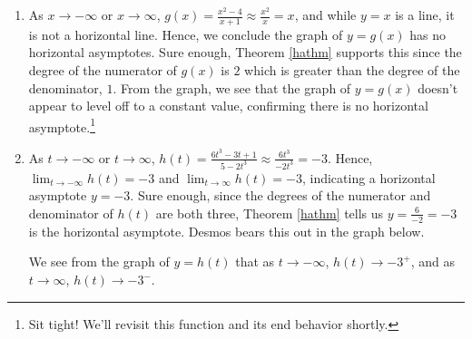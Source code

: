 \documentclass{ximera}
\begin{document}
\begin{example}
\begin{explanation}
\begin{enumerate}
\begin{center}
\end{center} 

Graphically, as $s \rightarrow  -\infty$ or $s \rightarrow  \infty$ , the graph $y = F(s)$ approaches the $s$-axis ($y = 0$).  More specifically, as $s \rightarrow -\infty$, $F(s)  \rightarrow 0^{-}$ and as $s \rightarrow \infty$, $F(s)  \rightarrow 0^{+}$.  

As a side note, the graph of $F$ appears to be symmetric about the origin.  Indeed, $F(-s) = \frac{5(-s)}{(-s)^2+1} = -\frac{5s}{s^2+1}$ proving $F$ is odd.


\item  As $x \rightarrow  -\infty$ or $x \rightarrow \infty$, $g(x) = \frac{x^2-4}{x+1} \approx \frac{x^2}{x} = x$, and while $y = x$ is a line, it is not a horizontal line.  Hence, we conclude the graph of $y = g(x)$ has no horizontal asymptotes.  Sure enough,  Theorem \ref{hathm} supports this since the degree of the numerator of $g(x)$ is $2$ which is greater than the degree of the denominator, $1$.   From the graph, we see that the graph of $y=g(x)$ doesn't appear to level off to a constant value, confirming there is no horizontal asymptote.\footnote{Sit tight!  We'll revisit this function and its end behavior shortly.}

\begin{center}
\end{center} 

\item   As $t \rightarrow -\infty$ or $t \rightarrow \infty$,  $h(t) = \frac{6t^3-3t+1}{5-2t^3} \approx  \frac{6t^3}{-2t^3} = -3$.  Hence, $\lim_{t \rightarrow  -\infty} h(t) = -3$ and $\lim_{t \rightarrow  \infty} h(t) = -3$, indicating a horizontal asymptote $y = -3$.  Sure enough, since the degrees of the numerator and denominator of $h(t)$ are both three,  Theorem \ref{hathm} tells us $y = \frac{6}{-2} = -3$ is the horizontal asymptote.   Desmos bears this out in the graph below.

\begin{center}
\end{center} 

We see from the graph of $y = h(t)$ that as $t \rightarrow -\infty$, $h(t) \rightarrow -3^{+}$, and as $t \rightarrow \infty$, $h(t) \rightarrow -3^{-}$.


\end{enumerate}
\end{explanation}
\end{example}
\end{document}
